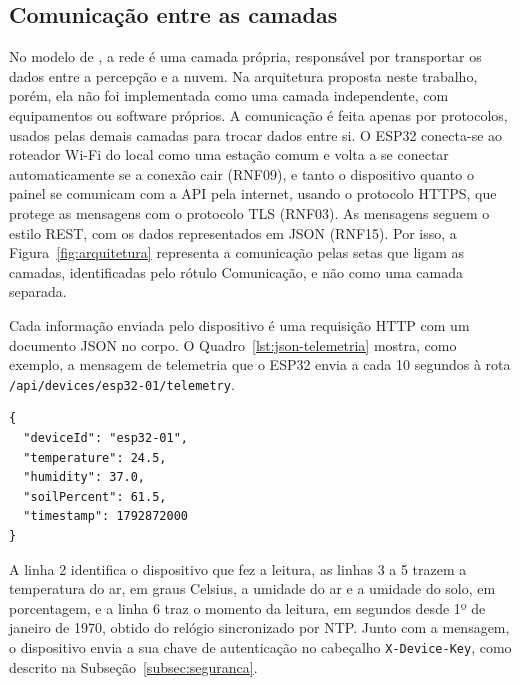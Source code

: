 \subsection{Comunicação entre as camadas}
\label{sec:rede}
\label{sec:longpolling}

No modelo de , a rede é uma camada própria, responsável por transportar os dados entre a percepção e a nuvem. Na arquitetura proposta neste trabalho, porém, ela não foi implementada como uma camada independente, com equipamentos ou software próprios. A comunicação é feita apenas por protocolos, usados pelas demais camadas para trocar dados entre si. O ESP32 conecta-se ao roteador Wi-Fi do local como uma estação comum e volta a se conectar automaticamente se a conexão cair (RNF09), e tanto o dispositivo quanto o painel se comunicam com a API pela internet, usando o protocolo HTTPS, que protege as mensagens com o protocolo TLS (RNF03). As mensagens seguem o estilo REST, com os dados representados em JSON (RNF15). Por isso, a Figura~\ref{fig:arquitetura} representa a comunicação pelas setas que ligam as camadas, identificadas pelo rótulo Comunicação, e não como uma camada separada.

Cada informação enviada pelo dispositivo é uma requisição HTTP com um documento JSON no corpo. O Quadro~\ref{lst:json-telemetria} mostra, como exemplo, a mensagem de telemetria que o ESP32 envia a cada 10 segundos à rota \texttt{/api/devices/esp32-01/telemetry}.

\vspace{0.6\baselineskip}
\noindent\begin{minipage}{\linewidth}
\begin{lstlisting}[language={}, caption={Exemplo de mensagem de telemetria enviada pelo dispositivo}, label={lst:json-telemetria}]
{
  "deviceId": "esp32-01",
  "temperature": 24.5,
  "humidity": 37.0,
  "soilPercent": 61.5,
  "timestamp": 1792872000
}
\end{lstlisting}
\vspace{-0.5\baselineskip}
\end{minipage}
\medskip

A linha 2 identifica o dispositivo que fez a leitura, as linhas 3 a 5 trazem a temperatura do ar, em graus Celsius, a umidade do ar e a umidade do solo, em porcentagem, e a linha 6 traz o momento da leitura, em segundos desde 1º de janeiro de 1970, obtido do relógio sincronizado por NTP. Junto com a mensagem, o dispositivo envia a sua chave de autenticação no cabeçalho \texttt{X-Device-Key}, como descrito na Subseção~\ref{subsec:seguranca}.

